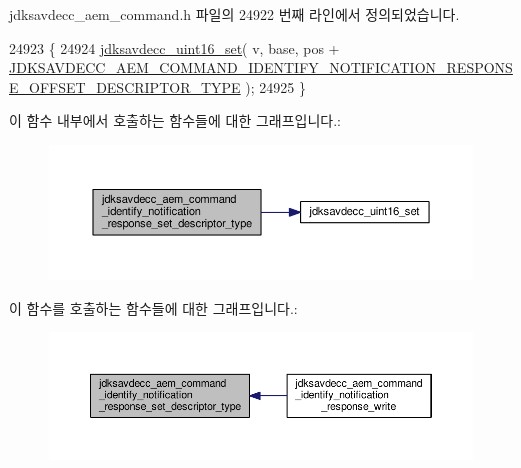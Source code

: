 jdksavdecc\+\_\+aem\+\_\+command.\+h 파일의 24922 번째 라인에서 정의되었습니다.


\begin{DoxyCode}
24923 \{
24924     \hyperlink{group__endian_ga14b9eeadc05f94334096c127c955a60b}{jdksavdecc\_uint16\_set}( v, base, pos + 
      \hyperlink{group__command__identify__notification_ga8268594073e5dc639d021490e91f051b}{JDKSAVDECC\_AEM\_COMMAND\_IDENTIFY\_NOTIFICATION\_RESPONSE\_OFFSET\_DESCRIPTOR\_TYPE}
       );
24925 \}
\end{DoxyCode}


이 함수 내부에서 호출하는 함수들에 대한 그래프입니다.\+:
\nopagebreak
\begin{figure}[H]
\begin{center}
\leavevmode
\includegraphics[width=350pt]{group__command__identify__notification_ga5a7d6b3ee695593b349fb5b0a7a2547b_cgraph}
\end{center}
\end{figure}




이 함수를 호출하는 함수들에 대한 그래프입니다.\+:
\nopagebreak
\begin{figure}[H]
\begin{center}
\leavevmode
\includegraphics[width=350pt]{group__command__identify__notification_ga5a7d6b3ee695593b349fb5b0a7a2547b_icgraph}
\end{center}
\end{figure}


